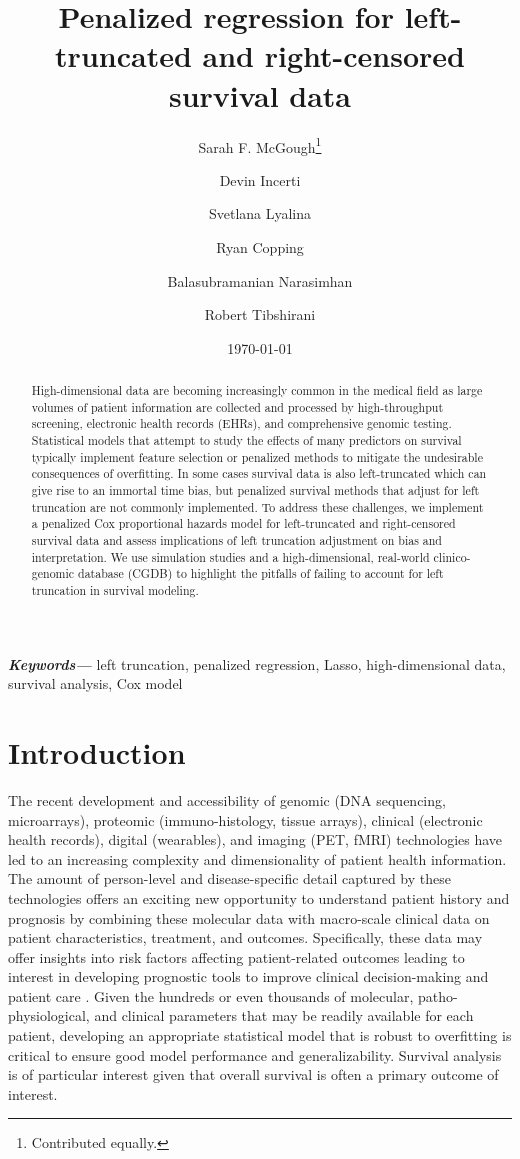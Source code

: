 \documentclass[11pt,final,fleqn]{article}\usepackage[]{graphicx}\usepackage[]{color}
\title{Penalized regression for left-truncated and right-censored survival data}
\author[1]{Sarah F. McGough\thanks{Contributed equally.}}
\author[1]{Devin Incerti\samethanks}
\author[1]{Svetlana Lyalina}
\author[1]{Ryan Copping}
\author[2, 3]{Balasubramanian Narasimhan}
\author[2, 3]{Robert Tibshirani}
\affil[1]{Genentech, Inc, South San Francisco, CA, USA}
\affil[2]{Department of Statistics, Stanford University, Stanford, CA, USA}
\affil[3]{Department of Biomedical Data Sciences, Stanford University, Stanford, CA, USA}
\date{\today}
\theoremstyle{plain}
\providecommand{\keywords}[1]
{
  \small	
  \textbf{\textit{Keywords---}} #1
}
\begin{document}
\maketitle

\begin{abstract}
    High-dimensional data are becoming increasingly common in the medical field as large volumes of patient information are collected and processed by high-throughput screening, electronic health records (EHRs), and comprehensive genomic testing. Statistical models that attempt to study the effects of many predictors on survival typically implement feature selection or penalized methods to mitigate the undesirable consequences of overfitting. In some cases survival data is also left-truncated which can give rise to an immortal time bias, but penalized survival methods that adjust for left truncation are not commonly implemented. To address these challenges, we implement a penalized Cox proportional hazards model for left-truncated and right-censored survival data and assess implications of left truncation adjustment on bias and interpretation. We use simulation studies and a high-dimensional, real-world clinico-genomic database (CGDB) to highlight the pitfalls of failing to account for left truncation in survival modeling.
\end{abstract}

\keywords{left truncation, penalized regression, Lasso, high-dimensional data, survival analysis, Cox model}

\section{Introduction}
The recent development and accessibility of genomic (DNA sequencing, microarrays), proteomic (immuno-histology, tissue arrays), clinical (electronic health records), digital (wearables), and imaging (PET, fMRI) technologies have led to an increasing complexity and dimensionality of patient health information. The amount of person-level and disease-specific detail captured by these technologies offers an exciting new opportunity to understand patient history and prognosis by combining these molecular data with macro-scale clinical data on patient characteristics, treatment, and outcomes. Specifically, these data may offer insights into risk factors affecting patient-related outcomes leading to interest in developing prognostic tools to improve clinical decision-making and patient care \cite{gui2005penalized, wishart2010predict, ow2016big, yousefi2017predicting}. Given the hundreds or even thousands of molecular, patho-physiological, and clinical parameters that may be readily available for each patient, developing an appropriate statistical model that is robust to overfitting is critical to ensure good model performance and generalizability. Survival analysis is of particular interest given that overall survival is often a primary outcome of interest.  
\end{document}
